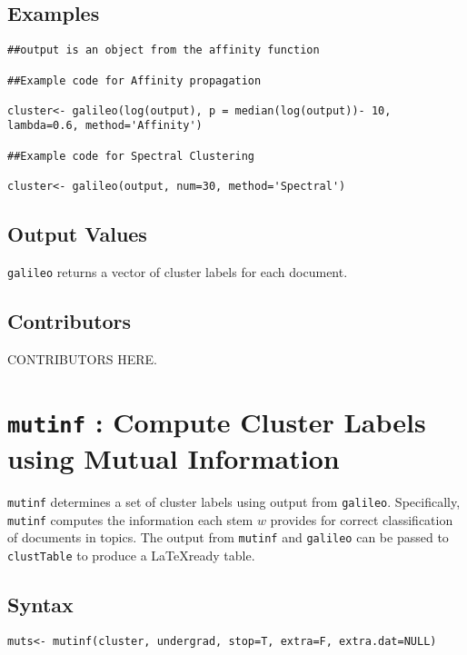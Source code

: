 \documentclass[12pt,letterpaper]{article}
\begin{document}
\subsection*{Examples}
\begin{verbatim}
##output is an object from the affinity function

##Example code for Affinity propagation

cluster<- galileo(log(output), p = median(log(output))- 10,
lambda=0.6, method='Affinity')

##Example code for Spectral Clustering

cluster<- galileo(output, num=30, method='Spectral')

\end{verbatim}

\subsection*{Output Values} {\tt galileo} returns a vector of cluster
labels for each document.


\subsection*{Contributors} CONTRIBUTORS HERE.


\clearpage

\section*{{\tt mutinf} : Compute Cluster Labels using Mutual Information}
\label{mutinf} {\tt mutinf} determines a set of cluster labels using
output from {\tt galileo}.  Specifically, {\tt mutinf} computes the
information each stem $w$ provides for correct classification of
documents in topics.  The output from {\tt mutinf} and {\tt galileo}
can be passed to {\tt clustTable} to produce a \LaTeX ready table.

\subsection*{Syntax}
\begin{verbatim}
muts<- mutinf(cluster, undergrad, stop=T, extra=F, extra.dat=NULL)
\end{verbatim}
\end{document}
